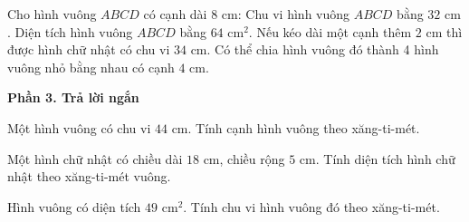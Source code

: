 \begin{ex} %
Cho hình vuông $ABCD$ có cạnh dài $8\text{ cm}$:
\choiceTF
{\True Chu vi hình vuông $ABCD$ bằng $32\text{ cm}$.}
{\True Diện tích hình vuông $ABCD$ bằng $64\text{ cm}^2$.}
{Nếu kéo dài một cạnh thêm $2\text{ cm}$ thì được hình chữ nhật có chu vi $34\text{ cm}$.}
{\True Có thể chia hình vuông đó thành 4 hình vuông nhỏ bằng nhau có cạnh $4\text{ cm}$.}
\end{ex}

\textbf{Phần 3. Trả lời ngắn}

\begin{ex} %
Một hình vuông có chu vi $44\text{ cm}$. Tính cạnh hình vuông theo xăng-ti-mét.
\end{ex}

\begin{ex} %
Một hình chữ nhật có chiều dài $18\text{ cm}$, chiều rộng $5\text{ cm}$. Tính diện tích hình chữ nhật theo xăng-ti-mét vuông.
\end{ex}

\begin{ex} %
Hình vuông có diện tích $49\text{ cm}^2$. Tính chu vi hình vuông đó theo xăng-ti-mét.
\end{ex}

